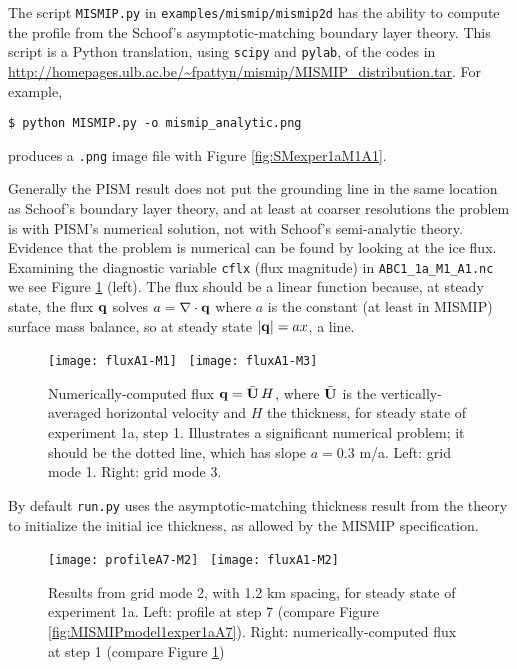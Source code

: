 The script \texttt{MISMIP.py} in \texttt{examples/mismip/mismip2d} has the ability to compute the profile from the Schoof's \cite{SchoofMarine1} asymptotic-matching boundary layer theory.  This script is a Python translation, using \texttt{scipy} and \texttt{pylab}, of the \Matlab codes in \url{http://homepages.ulb.ac.be/~fpattyn/mismip/MISMIP_distribution.tar}.  For example,

\begin{verbatim}
$ python MISMIP.py -o mismip_analytic.png
\end{verbatim}
 
\noindent produces a \verb|.png| image file with Figure \ref{fig:SMexper1aM1A1}.

Generally the PISM result does not put the grounding line in the same location as Schoof's boundary layer theory, and at least at coarser resolutions the problem is with PISM's numerical solution, not with Schoof's semi-analytic theory.  Evidence that the problem is numerical can be found by looking at the ice flux.  Examining the diagnostic variable \texttt{cflx} (flux magnitude) in \texttt{ABC1_1a_M1_A1.nc} we see Figure \ref{fig:cflx1aA1} (left).  The flux should be a linear function because, at steady state, the flux $\mathbf{q}$ solves $a=\nabla\cdot\mathbf{q}$ where $a$ is the constant (at least in MISMIP) surface mass balance, so at steady state $|\mathbf{q}| = a x$, a line.

\begin{figure}[ht]
\centering
\texttt{[image: fluxA1-M1]} \,
\texttt{[image: fluxA1-M3]}
\caption{Numerically-computed flux $\mathbf{q} = \bar{\mathbf{U}}\, H$, where $\bar{\mathbf{U}}$ is the vertically-averaged horizontal velocity and $H$ the thickness, for steady state of experiment 1a, step 1.  Illustrates a significant numerical problem; it should be the dotted line, which has slope $a = 0.3$ m/a.  Left: grid mode 1.  Right: grid mode 3.}
\label{fig:cflx1aA1}
\end{figure}

By default \texttt{run.py} uses the asymptotic-matching thickness result from the \cite{SchoofMarine1} theory to initialize the initial ice thickness, as allowed by the MISMIP specification.

\begin{figure}[ht]
\centering
\texttt{[image: profileA7-M2]} \,
\texttt{[image: fluxA1-M2]}
\caption{Results from grid mode 2, with 1.2 km spacing, for steady state of experiment 1a.  Left: profile at step 7 (compare Figure \ref{fig:MISMIPmodel1exper1aA7}).  Right: numerically-computed flux at step 1 (compare Figure \ref{fig:cflx1aA1})}
\label{fig:MISMIPmode2results}
\end{figure}

